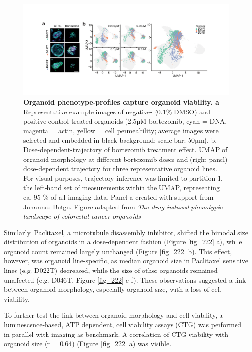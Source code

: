 \begin{flushleft}
\begin{figure}[h]
\centering
\includegraphics[width=\textwidth,
                height=\textheight,
                keepaspectratio]{figures/promise/pdf/fig_2_1.pdf}
\caption[Organoid phenotype-profiles capture organoid viability]{\textbf{Organoid phenotype-profiles capture organoid viability. a} Representative example images of negative- (0.1\% DMSO) and positive control treated organoids (2.5µM bortezomib, cyan = DNA, magenta = actin, yellow = cell permeability; average images were selected and embedded in black background; scale bar: 50µm). b, Dose-dependent-trajectory of bortezomib treatment effect. UMAP of organoid morphology at different bortezomib doses and (right panel) dose-dependent trajectory for three representative organoid lines. For visual purposes, trajectory inference was limited to partition 1, the left-hand set of measurements within the UMAP, representing ca. 95 \% of all imaging data. Panel a created with support from Johannes Betge. Figure adapted from \textit{The drug-induced phenotypic landscape of colorectal cancer organoids} \citep{betgeDruginducedPhenotypicLandscape2022}}
\label{fig_221}
\end{figure}
\bigbreak

Similarly, Paclitaxel, a microtubule disassembly inhibitor, shifted the bimodal size distribution of organoids in a dose-dependent fashion (Figure \ref{fig_222} a), while organoid count remained largely unchanged (Figure \ref{fig_222} b). This effect, however, was organoid line-specific, as median organoid size in Paclitaxel sensitive lines (e.g. D022T) decreased, while the size of other organoids remained unaffected (e.g. D046T, Figure \ref{fig_222} c-f). These observations suggested a link between organoid morphology, especially organoid size, with a loss of cell viability. 

\bigbreak
To further test the link between organoid morphology and cell viability, a luminescence-based, ATP dependent, cell viability assays (CTG) was performed in parallel with imaging as benchmark. A correlation of CTG viability with organoid size (r = 0.64) (Figure \ref{fig_222} a) was visible. 


\end{flushleft}
